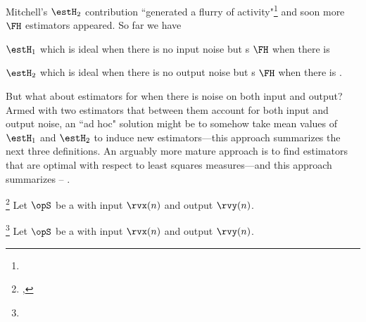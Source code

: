 Mitchell's $\estH_2$ contribution ``generated a flurry of activity"\footnote{}
and soon more $\FH$ estimators appeared.
So far we have
\begin{listi}
  \item $\estH_1$ which is ideal when there is no input noise but
        s $\FH$ when there is 
  \item $\estH_2$ which is ideal when there is no output noise but
        s $\FH$ when there is .
\end{listi}
But what about estimators for when there is noise on both input and output?
Armed with two estimators that between them account for both input and output noise,
an ``ad hoc" solution might be to somehow take mean values of $\estH_1$ and $\estH_2$
to induce new estimators---this approach summarizes the next three definitions.
An arguably more mature approach is to find estimators that are optimal with respect to least squares measures---and
this approach summarizes  -- .

\begin{definition}
\footnote{
  ,
  }
\label{def:Havg}
Let $\opS$ be a  with input $\rvx(n)$ and output $\rvy(n)$.
\end{definition}

\begin{definition}
\footnote{
  }
\label{def:Hgm}
Let $\opS$ be a  with input $\rvx(n)$ and output $\rvy(n)$.
\end{definition}

